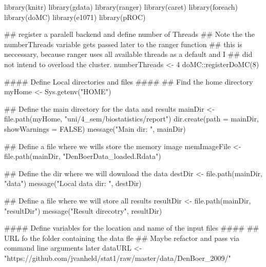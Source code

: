 \documentclass[]{article}
\newenvironment{Shaded}{\begin{snugshade}}{\end{snugshade}}
\newcommand{\CommentTok}[1]{\textcolor[rgb]{0.50,0.62,0.50}{#1}}
\newcommand{\DataTypeTok}[1]{\textcolor[rgb]{0.87,0.87,0.75}{#1}}
\newcommand{\DecValTok}[1]{\textcolor[rgb]{0.86,0.86,0.80}{#1}}
\newcommand{\KeywordTok}[1]{\textcolor[rgb]{0.94,0.87,0.69}{#1}}
\newcommand{\NormalTok}[1]{\textcolor[rgb]{0.80,0.80,0.80}{#1}}
\newcommand{\OperatorTok}[1]{\textcolor[rgb]{0.94,0.94,0.82}{#1}}
\newcommand{\OtherTok}[1]{\textcolor[rgb]{0.94,0.94,0.56}{#1}}
\newcommand{\StringTok}[1]{\textcolor[rgb]{0.80,0.58,0.58}{#1}}
\begin{document}
\begin{Shaded}
\begin{Highlighting}[]
\KeywordTok{library}\NormalTok{(knitr)}
\KeywordTok{library}\NormalTok{(gdata)}
\KeywordTok{library}\NormalTok{(ranger)}
\KeywordTok{library}\NormalTok{(caret)}
\KeywordTok{library}\NormalTok{(foreach)}
\KeywordTok{library}\NormalTok{(doMC)}
\KeywordTok{library}\NormalTok{(e1071)}
\KeywordTok{library}\NormalTok{(pROC)}

\CommentTok{## register a paralell backend and define number of Threads}
\CommentTok{## Note the the numberThreads variable gets passed later to the ranger function}
\CommentTok{## this is neccessary, because ranger uses all available threads as a default and I }
\CommentTok{## did not intend to overload the cluster.}
\NormalTok{numberThreads <-}\StringTok{ }\DecValTok{4}
\NormalTok{doMC}\OperatorTok{::}\KeywordTok{registerDoMC}\NormalTok{(}\DecValTok{8}\NormalTok{)}


\CommentTok{####  Define Local directories and files ####}
\CommentTok{## Find the home directory}
\NormalTok{myHome <-}\StringTok{ }\KeywordTok{Sys.getenv}\NormalTok{(}\StringTok{"HOME"}\NormalTok{)}

\CommentTok{## Define the main directory for the  data and results}
\NormalTok{mainDir <-}\StringTok{ }\KeywordTok{file.path}\NormalTok{(myHome, }\StringTok{"uni/4_sem/biostatistics/report"}\NormalTok{)}
\KeywordTok{dir.create}\NormalTok{(}\DataTypeTok{path =}\NormalTok{ mainDir, }\DataTypeTok{showWarnings =} \OtherTok{FALSE}\NormalTok{)}
\KeywordTok{message}\NormalTok{(}\StringTok{"Main dir: "}\NormalTok{, mainDir)}

\CommentTok{## Define a file where we wills store the memory image}
\NormalTok{memImageFile <-}\StringTok{ }\KeywordTok{file.path}\NormalTok{(mainDir, }\StringTok{"DenBoerData_loaded.Rdata"}\NormalTok{)}

\CommentTok{## Define the dir where we will download the data}
\NormalTok{destDir <-}\StringTok{ }\KeywordTok{file.path}\NormalTok{(mainDir, }\StringTok{"data"}\NormalTok{)}
\KeywordTok{message}\NormalTok{(}\StringTok{"Local data dir: "}\NormalTok{, destDir)}

\CommentTok{## Define a file where we will store all results}
\NormalTok{resultDir <-}\StringTok{ }\KeywordTok{file.path}\NormalTok{(mainDir, }\StringTok{"resultDir"}\NormalTok{)}
\KeywordTok{message}\NormalTok{(}\StringTok{"Result direcotry"}\NormalTok{, resultDir)}


\CommentTok{#### Define variables for the location and name of the input files ####}
\CommentTok{## URL fo the folder containing the data fle}
\CommentTok{## Maybe refactor and pass via command line arguments later}
\NormalTok{dataURL <-}\StringTok{ "https://github.com/jvanheld/stat1/raw/master/data/DenBoer_2009/"}


\end{Highlighting}
\end{Shaded}
\end{document}
